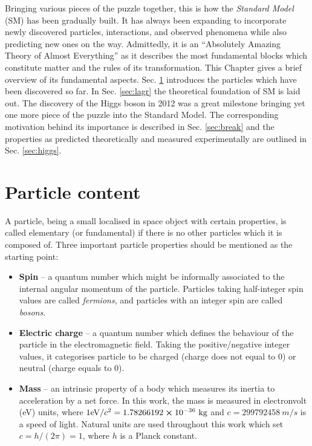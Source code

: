 Bringing various pieces of the puzzle together, this is how the \textit{Standard Model} (SM) has been gradually built. It has always been expanding to incorporate newly discovered particles, interactions, and observed phenomena while also predicting new ones on the way. Admittedly, it is an \enquote{Absolutely Amazing Theory of Almost Everything} \cite{Mulders:2019vhb} as it describes the most fundamental blocks which constitute matter and the rules of its transformation. This Chapter gives a brief overview of its fundamental aspects. Sec. \ref{sec:particles} introduces the particles which have been discovered so far. In Sec. \ref{sec:lagr} the theoretical foundation of SM is laid out. The discovery of the Higgs boson in 2012 \cite{ATLAS:2012yve,CMS:2012qbp} was a great milestone bringing yet one more piece of the puzzle into the Standard Model. The corresponding motivation behind its importance is described in Sec. \ref{sec:break} and the properties as predicted theoretically and measured experimentally are outlined in Sec. \ref{sec:higgs}.

\section{Particle content}\label{sec:particles}

A particle, being a small localised in space object with certain properties, is called elementary (or fundamental) if there is no other particles which it is composed of. Three important particle properties should be mentioned as the starting point:
\begin{itemize}
    \item \textbf{Spin} -- a quantum number which might be informally associated to the internal angular momentum of the particle. Particles taking half-integer spin values are called \textit{fermions}, and particles with an integer spin are called \textit{bosons}.
    
    \item \textbf{Electric charge} -- a quantum number which defines the behaviour of the particle in the electromagnetic field. Taking the positive/negative integer values, it categorises particle to be charged (charge does not equal to 0) or neutral (charge equals to 0).
    
    \item \textbf{Mass} -- an intrinsic property of a body which measures its inertia to acceleration by a net force. In this work, the mass is measured in electronvolt (eV) units, where $1 \text{eV}/c^2 = 1.78266192 \cross 10^{-36} ~\text{kg}$ and $c = 299 792 458 ~m/s$ is a speed of light. Natural units are used throughout this work which set $c = h/(2\pi) = 1$, where $h$ is a Planck constant.  
\end{itemize}

